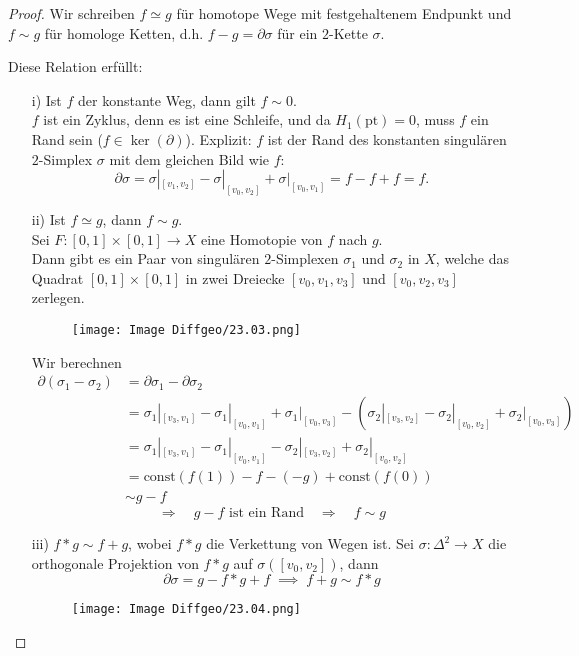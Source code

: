 \documentclass[fleqn, 12pt, letterpaper]{article}
\begin{document}
\begin{proof}
Wir schreiben $f \simeq g$ für homotope Wege mit festgehaltenem Endpunkt  
und $f \sim g$ für homologe Ketten, d.h. $f - g = \partial \sigma$ für ein $2$-Kette $\sigma$.

Diese Relation erfüllt:

\begin{itemize}
  \item[i)] Ist $f$ der konstante Weg, dann gilt $f \sim 0$. \\
  $f$ ist ein Zyklus, denn es ist eine Schleife, und da $H_1(\mathrm{pt}) = 0$, muss $f$ ein Rand sein ($f\in \ker(\partial)$). 
  Explizit: $f$ ist der Rand des konstanten singulären $2$-Simplex $\sigma$ mit dem gleichen Bild wie $f$:
  \[
  \partial \sigma = \sigma |_{ [v_1, v_2]} - \sigma |_{ [v_0, v_2]} + \sigma |_{ [v_0, v_1]} = f - f + f = f.
  \]

  \item[ii)] Ist $f \simeq g$, dann $f \sim g$. \\
  Sei $F : [0,1] \times [0,1] \to X$ eine Homotopie von $f$ nach $g$. \\
  Dann gibt es ein Paar von singulären $2$-Simplexen $\sigma_1$ und $\sigma_2$ in $X$, welche das Quadrat $[0,1] \times [0,1]$ in zwei Dreiecke $[v_0,v_1,v_3]$ und $[v_0,v_2,v_3]$ zerlegen.
      \begin{figure}[H]
    \centering
    \texttt{[image: Image Diffgeo/23.03.png]}
 \end{figure}

Wir berechnen
\begin{align*}
  \partial(\sigma_1 - \sigma_2)
  &= \partial \sigma_1 - \partial \sigma_2 \\
  &= \sigma_1|_{[v_3,v_1]} - \sigma_1|_{[v_0,v_1]} + \sigma_1|_{[v_0,v_3]}
     - \left( \sigma_2|_{[v_3,v_2]} - \sigma_2|_{[v_0,v_2]} + \sigma_2|_{[v_0,v_3]} \right) \\
  &= \sigma_1|_{[v_3,v_1]} - \sigma_1|_{[v_0,v_1]} - \sigma_2|_{[v_3,v_2]} + \sigma_2|_{[v_0,v_2]}  \\
  &= \text{const}(f(1)) - f - (-g) + \text{const}(f(0)) \\
  &\sim g - f
\end{align*}
\[
\Rightarrow\quad g - f \text{ ist ein Rand} \quad \Rightarrow\quad f \sim g
\]

\medskip

\item[iii)] $f * g \sim f + g$, wobei $f * g$ die Verkettung von Wegen ist.  
Sei $\sigma : \Delta^2 \to X$ die orthogonale Projektion von $f * g$ auf  
$\sigma([v_0,v_2])$, dann
\[
\partial \sigma = g - f * g + f \;\implies\; f+g\sim f*g
\]
\begin{figure}[H]
    \centering
    \texttt{[image: Image Diffgeo/23.04.png]}
 \end{figure}


\end{itemize}
\end{proof}
\end{document}
